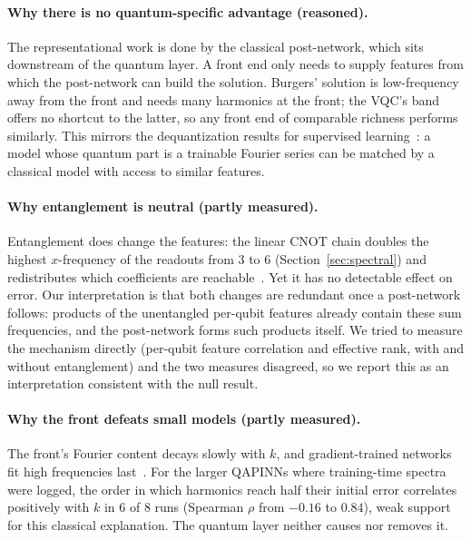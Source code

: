\documentclass[11pt]{article}
\begin{document}
\paragraph{Why there is no quantum-specific advantage (reasoned).} The representational
work is done by the classical post-network, which sits downstream of the quantum layer.
A front end only needs to supply features from which the post-network can build the
solution. Burgers' solution is low-frequency away from the front and needs many
harmonics at the front; the VQC's band offers no shortcut to the latter, so any front
end of comparable richness performs similarly. This mirrors the dequantization results
for supervised learning~\cite{landman,sweke}: a model whose quantum part is a
trainable Fourier series can be matched by a classical model with access to similar
features.

\paragraph{Why entanglement is neutral (partly measured).} Entanglement does change the
features: the linear CNOT chain doubles the highest $x$-frequency of the readouts from 3
to 6 (Section~\ref{sec:spectral}) and redistributes which coefficients are
reachable~\cite{mhiri}. Yet it has no detectable effect on error. Our interpretation is
that both changes are redundant once a post-network follows: products of the
unentangled per-qubit features already contain these sum frequencies, and the
post-network forms such products itself. We tried to measure the
mechanism directly (per-qubit feature correlation and effective rank, with and without
entanglement) and the two measures disagreed, so we report this as an interpretation
consistent with the null result.

\paragraph{Why the front defeats small models (partly measured).} The front's Fourier
content decays slowly with $k$, and gradient-trained networks fit high frequencies
last~\cite{xu,rahaman}. For the larger QAPINNs where training-time spectra were logged,
the order in which harmonics reach half their initial error correlates positively with
$k$ in 6 of 8 runs (Spearman $\rho$ from $-0.16$ to $0.84$), weak support for this
classical explanation. The quantum layer neither causes nor removes it.

\end{document}
